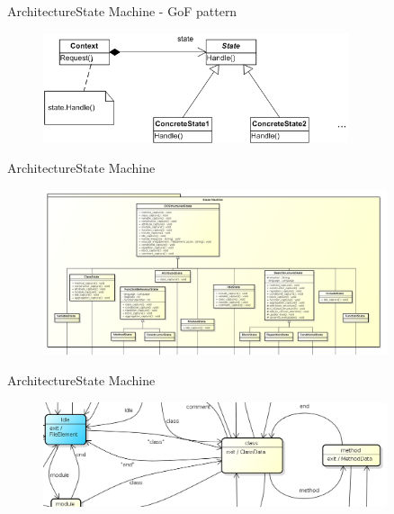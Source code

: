 \documentclass[10pt]{beamer}
\begin{document}
\begin{frame}{Architecture}{State Machine - GoF pattern}
  \begin{figure}[stategof]
    \includegraphics[width=0.8\textwidth]{images/state.png}
  \end{figure}
\end{frame}

\begin{frame}{Architecture}{State Machine}
  \begin{figure}[All]
    \includegraphics[width=0.9\textwidth]{images/fsmPack.png}
  \end{figure}
\end{frame}

\begin{frame}{Architecture}{State Machine}
  \begin{figure}[Look at FSM]
    \includegraphics[width=0.9\textwidth]{images/idleToClassToMethod.png}
  \end{figure}
\end{frame}
\end{document}
